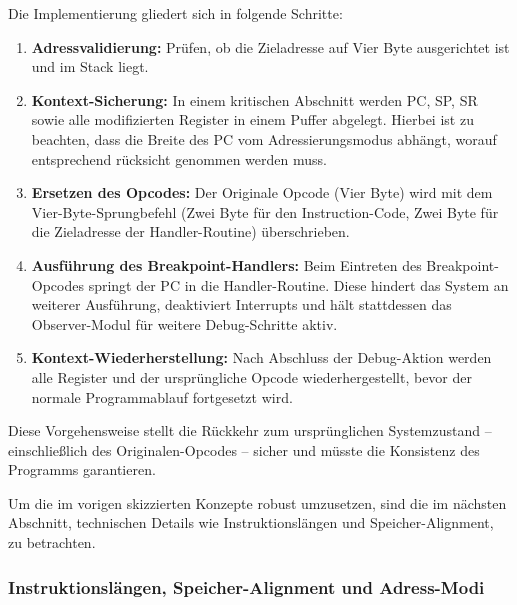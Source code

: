 Die Implementierung gliedert sich in folgende Schritte:
\begin{enumerate}
	\item \textbf{Adressvalidierung:} Pr\"ufen, ob die Zieladresse auf Vier Byte ausgerichtet ist und im Stack liegt.
	  
	\item \textbf{Kontext-Sicherung:} In einem kritischen Abschnitt werden PC, SP, SR sowie alle modifizierten Register in einem Puffer abgelegt. Hierbei ist zu beachten, dass die Breite des PC vom Adressierungsmodus abh\"angt, worauf entsprechend r\"ucksicht genommen werden muss. 
	
	\item \textbf{Ersetzen des Opcodes:} Der Originale Opcode (Vier Byte) wird mit dem Vier-Byte-Sprungbefehl (Zwei Byte f\"ur den Instruction-Code, Zwei Byte f\"ur die Zieladresse der Handler-Routine) \"uberschrieben. 
	
	\item \textbf{Ausf\"uhrung des Breakpoint-Handlers:} Beim Eintreten des Breakpoint-Opcodes springt der PC in die Handler-Routine. Diese hindert das System an weiterer Ausf\"uhrung, deaktiviert Interrupts und h\"alt stattdessen das Observer-Modul f\"ur weitere Debug-Schritte aktiv.
	
	\item \textbf{Kontext-Wiederherstellung:} Nach Abschluss der Debug-Aktion werden alle Register und der urspr\"ungliche Opcode wiederhergestellt, bevor der normale Programmablauf fortgesetzt wird.
\end{enumerate}

Diese Vorgehensweise stellt die R\"uckkehr zum urspr\"unglichen Systemzustand – einschlie{\ss}lich des Originalen-Opcodes – sicher und m\"usste die Konsistenz des Programms garantieren.

Um die im vorigen  skizzierten Konzepte robust umzusetzen, sind die im n\"achsten Abschnitt, technischen Details wie Instruktionsl\"angen und Speicher-Alignment, zu betrachten.\AI


\newpage
\subsubsection{Instruktionsl\"angen, Speicher-Alignment und Adress-Modi}
\label{sec:TechnischeUmsetzunSoftwareBreakpoints}

